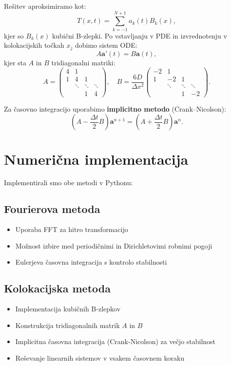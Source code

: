 \documentclass[12pt,a4paper]{article}
\begin{document}
Rešitev aproksimiramo kot:
\[
T(x,t) = \sum_{k=-1}^{N+1} a_k(t) B_k(x),
\]
kjer so $B_k(x)$ kubični B-zlepki. Po vstavljanju v PDE in izvrednotenju v kolokacijskih točkah $x_j$ dobimo sistem ODE:
\[
A \mathbf{a}'(t) = B \mathbf{a}(t),
\]
kjer sta $A$ in $B$ tridiagonalni matriki:
\[
A = \begin{pmatrix}
4 & 1 & & \\
1 & 4 & 1 & \\
& \ddots & \ddots & \ddots \\
& & 1 & 4
\end{pmatrix}, \quad
B = \frac{6D}{\Delta x^2} \begin{pmatrix}
-2 & 1 & & \\
1 & -2 & 1 & \\
& \ddots & \ddots & \ddots \\
& & 1 & -2
\end{pmatrix}.
\]

Za časovno integracijo uporabimo \textbf{implicitno metodo} (Crank–Nicolson):
\[
\left(A - \frac{\Delta t}{2} B\right) \mathbf{a}^{n+1} = \left(A + \frac{\Delta t}{2} B\right) \mathbf{a}^n.
\]

\section{Numerična implementacija}

Implementirali smo obe metodi v Pythonu:

\subsection{Fourierova metoda}

\begin{itemize}
    \item Uporaba FFT za hitro transformacijo
    \item Možnost izbire med periodičnimi in Dirichletovimi robnimi pogoji
    \item Eulerjeva časovna integracija s kontrolo stabilnosti
\end{itemize}

\subsection{Kolokacijska metoda}

\begin{itemize}
    \item Implementacija kubičnih B-zlepkov
    \item Konstrukcija tridiagonalnih matrik $A$ in $B$
    \item Implicitna časovna integracija (Crank-Nicolson) za večjo stabilnost
    \item Reševanje linearnih sistemov v vsakem časovnem koraku
\end{itemize}
\end{document}
